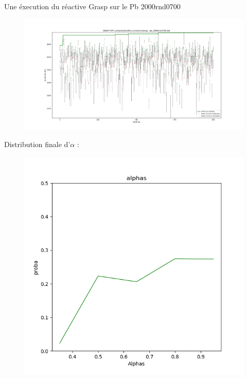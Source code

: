 \begin{example}
  Une éxecution du réactive Grasp sur le Pb 2000rnd0700
  \begin{figure}[htb!]
    \centering
    \includegraphics[scale=0.37]{fig/Na=100,nb=500/pb2000rnd0700.png}
    \label{fig:reactive2000rnd0700}
  \end{figure}

  \vfill
  \break
  
  Distribution finale d'$\alpha$ :
  \begin{figure}[htb!]
    \centering
    \includegraphics[scale=0.5]{fig/Alpha1.png}
    \label{fig:alpha1}
  \end{figure}
\end{example}


